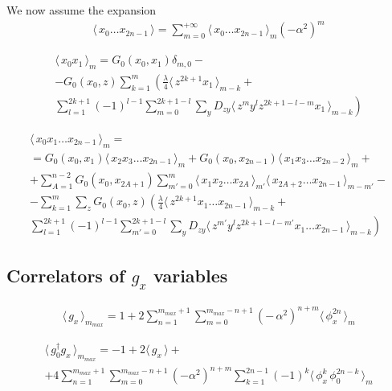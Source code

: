 \documentclass[12pt]{article}
\newcommand{\lr}[1]{ \left( #1 \right) }
\newcommand{\vev}[1]{ \langle \, #1 \, \rangle }
\begin{document}
We now assume the expansion
\begin{eqnarray}
\label{expansion_assumed}
 \vev{x_0 \ldots x_{2 n - 1}} = \sum\limits_{m=0}^{+\infty}
 \vev{x_0 \ldots x_{2 n - 1}}_m \lr{-\alpha^2}^m
\end{eqnarray}

\begin{eqnarray}
\label{sd_g2_coord_algorithmic}
 \vev{x_0 x_1}_m = G_0\lr{x_0, x_1} \delta_{m, 0}
 - \nonumber \\ -
 G_0\lr{x_0, z}
 \sum\limits_{k=1}^{m}
 \left(
 \frac{\lambda}{4} \vev{z^{2 k + 1} x_1}_{m - k}
 + \right. \nonumber \\ \left.
 \sum\limits_{l=1}^{2 k + 1} \lr{-1}^{l-1}
 \sum\limits_{m=0}^{2 k + 1 - l}
 \sum\limits_y D_{z y}
 \vev{z^m y^l z^{2k+1-l-m} x_1}_{m - k}
 \right)
\end{eqnarray}

\begin{eqnarray}
\label{sd_gn_coord_algorithmic}
 \vev{x_0 x_1 \ldots x_{2 n - 1}}_m
 = \nonumber \\ =
 G_0\lr{x_0, x_1} \vev{x_2 x_3 \ldots x_{2 n - 1}}_m
 +
 G_0\lr{x_0, x_{2 n - 1}} \vev{x_1 x_3 \ldots x_{2 n - 2}}_m
 + \nonumber \\ +
 \sum\limits_{A=1}^{n-2}
 G_0\lr{x_0, x_{2A+1}}
 \sum\limits_{m'=0}^m
 \vev{x_1 x_2 \ldots x_{2 A}}_{m'}
 \vev{x_{2 A+2} \ldots x_{2 n - 1}}_{m - m'}
 - \nonumber \\ -
 \sum\limits_{k=1}^{m} \sum\limits_z
 G_0\lr{x_0, z}
 \left(
 \frac{\lambda}{4} \vev{z^{2 k + 1} x_1 \ldots x_{2 n - 1}}_{m - k}
 + \right. \nonumber \\ \left.
 \sum\limits_{l=1}^{2 k + 1} \lr{-1}^{l-1}
 \sum\limits_{m'=0}^{2 k + 1 - l}
 \sum\limits_y D_{z y}
 \vev{z^{m'} y^l z^{2k+1-l-m'} x_1 \ldots x_{2 n - 1}}_{m - k}
 \right)
\end{eqnarray}


\subsection{Correlators of $g_x$ variables}
\label{subsec:gx_correlators_coordinate}

\begin{eqnarray}
\label{gx_vev_coordinate}
 \vev{g_x}_{m_{max}} = 1 + 2 \sum\limits_{n=1}^{m_{max}+1} \sum\limits_{m=0}^{m_{max}-n+1} \lr{- \, \alpha^2}^{n+m} \vev{\phi_x^{2 n}}_m
\end{eqnarray}

\begin{eqnarray}
\label{gx_vev_coordinate}
 \vev{g^{\dag}_0 g_x}_{m_{max}}
 =
 -1 + 2 \vev{g_x}
 + \nonumber \\ +
 4 \sum\limits_{n=1}^{m_{max}+1}
   \sum\limits_{m=0}^{m_{max}-n+1}
 \lr{-\alpha^2}^{n+m}
 \sum\limits_{k=1}^{2 n - 1} \lr{-1}^k
 \vev{\phi_x^k \, \phi_0^{2n - k}}_m
\end{eqnarray}
\end{document}
